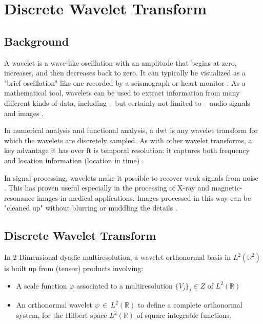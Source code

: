 \section{Discrete Wavelet Transform}
\label{sec:Discrete Wavelet Transform}
\subsection{Background}
A wavelet is a wave-like oscillation with an amplitude that begins at zero, increases, and then decreases back to zero. It can typically be visualized as a "brief oscillation" like one recorded by a seismograph or heart monitor \cite{lipson2010optical}. As a mathematical tool, wavelets can be used to extract information from many different kinds of data, including – but certainly not limited to – audio signals and images \cite{lovis2014ehealth}.

In numerical analysis and functional analysis, a \gls{dwt} is any wavelet transform for which the wavelets are discretely sampled. As with other wavelet transforms, a key advantage it has over \gls{ft} is temporal resolution: it captures both frequency and location information (location in time) \cite{yan2014machinery}.


In signal processing, wavelets make it possible to recover weak signals from noise . This has proven useful especially in the processing of X-ray and magnetic-resonance images in medical applications. Images processed in this way can be "cleaned up" without blurring or muddling the details \cite{leewavelet}.


\subsection{Discrete Wavelet Transform}
In 2-Dimensional dyadic multiresolution, a wavelet orthonormal basis in $L^2(\mathbb{R}^2)$ is built up from (tensor) products involving:

\begin{itemize}[noitemsep,nolistsep]
	\item A scale function $\varphi$ associated to a multiresolution $\{V_j\}_j\in Z$ of $L^2(\mathbb{R})$
	\item An orthonormal wavelet $\psi \,\in\, L^2(\mathbb{R})$  to define a complete
	orthonormal system, for the	Hilbert space
	\(\scriptstyle L^2\left(\mathbb{R}\right)\) of
	square integrable functions.
\end{itemize}

